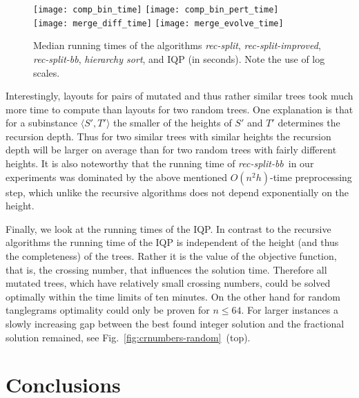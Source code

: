 \documentclass[runningheads,a4paper]{llncs}
\newcommand{\ttree}[1]{\ensuremath{\langle #1 \rangle}}
\newcommand{\recsplit}{\emph{rec-split}}
\newcommand{\recimproved}{\emph{rec-split-improved}}
\newcommand{\recbb}{\emph{rec-split-bb}}
\newcommand{\hiersort}{\emph{hierarchy sort}}
\begin{document}
\begin{figure}[tb]
  \centering
  \texttt{[image: comp\_bin\_time]}
  \hfill
  \texttt{[image: comp\_bin\_pert\_time]}\\
  \texttt{[image: merge\_diff\_time]}
  \hfill
  \texttt{[image: merge\_evolve\_time]}
  \caption{Median running times of the algorithms \recsplit, \recimproved,
    \recbb, \hiersort, and IQP (in seconds).  Note the use of log scales.}
  \label{fig:times}
  \vspace{-4ex}
\end{figure}

Interestingly, layouts for pairs of mutated and thus rather similar
trees took much more time to compute than layouts for two random
trees. One explanation is that for a subinstance \ttree{S',T'} the
smaller of the heights of $S'$ and $T'$ determines the recursion
depth. Thus for two similar trees with similar heights the recursion
depth will be larger on average than for two random trees with fairly
different heights. It is also noteworthy that the running time of
\recbb\ in our experiments was dominated by the above mentioned $O(n^2
h)$-time preprocessing step, which unlike the recursive algorithms
does not depend exponentially on the height.

Finally, we look at the running times of the IQP. In contrast to the
recursive algorithms the running time of the IQP is independent of the
height (and thus the completeness) of the trees. Rather it is the
value of the objective function, that is, the crossing number, that influences the solution time. Therefore all
mutated trees, which have relatively small crossing numbers, could be
solved optimally within the time limits of ten minutes. On the other
hand for random tanglegrams optimality could only be proven for $n \le
64$.
For larger instances a slowly increasing gap between the best found integer solution and the fractional
solution remained, see Fig.~\ref{fig:crnumbers-random}~(top).

\section{Conclusions}
\end{document}
